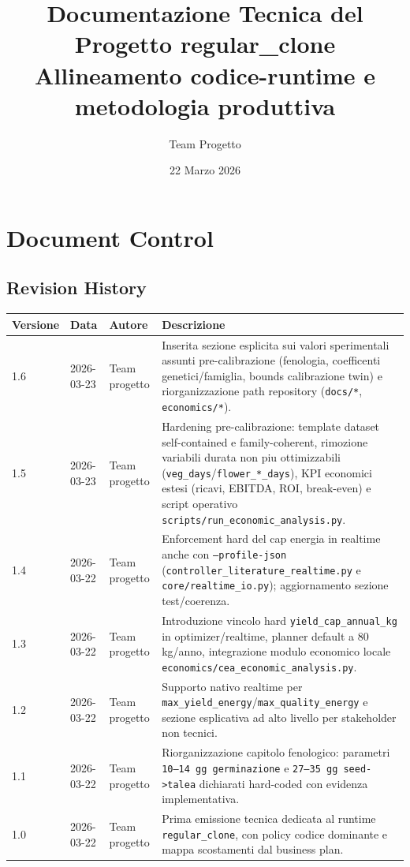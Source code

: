 ﻿\documentclass[11pt,a4paper]{report}
\title{
  \vspace{2cm}
  \textbf{Documentazione Tecnica del Progetto regular\_clone}\\
  \large Allineamento codice-runtime e metodologia produttiva
}
\author{Team Progetto}
\date{22 Marzo 2026}
\begin{document}
\maketitle
\tableofcontents
\newpage

\chapter{Document Control}

\section{Revision History}
\begin{longtable}{@{}p{2.2cm}p{2.2cm}p{3.6cm}p{6.8cm}@{}}
\toprule
Versione & Data & Autore & Descrizione \\ \midrule
1.6 & 2026-03-23 & Team progetto & Inserita sezione esplicita sui valori sperimentali assunti pre-calibrazione (fenologia, coefficenti genetici/famiglia, bounds calibrazione twin) e riorganizzazione path repository (\texttt{docs/*}, \texttt{economics/*}). \\
1.5 & 2026-03-23 & Team progetto & Hardening pre-calibrazione: template dataset self-contained e family-coherent, rimozione variabili durata non piu ottimizzabili (\texttt{veg\_days}/\texttt{flower\_*\_days}), KPI economici estesi (ricavi, EBITDA, ROI, break-even) e script operativo \texttt{scripts/run\_economic\_analysis.py}. \\
1.4 & 2026-03-22 & Team progetto & Enforcement hard del cap energia in realtime anche con \texttt{--profile-json} (\texttt{controller\_literature\_realtime.py} e \texttt{core/realtime\_io.py}); aggiornamento sezione test/coerenza. \\
1.3 & 2026-03-22 & Team progetto & Introduzione vincolo hard \texttt{yield\_cap\_annual\_kg} in optimizer/realtime, planner default a 80 kg/anno, integrazione modulo economico locale \texttt{economics/cea\_economic\_analysis.py}. \\
1.2 & 2026-03-22 & Team progetto & Supporto nativo realtime per \texttt{max\_yield\_energy}/\texttt{max\_quality\_energy} e sezione esplicativa ad alto livello per stakeholder non tecnici. \\
1.1 & 2026-03-22 & Team progetto & Riorganizzazione capitolo fenologico: parametri \texttt{10--14 gg germinazione} e \texttt{27--35 gg seed->talea} dichiarati hard-coded con evidenza implementativa. \\
1.0 & 2026-03-22 & Team progetto & Prima emissione tecnica dedicata al runtime \texttt{regular\_clone}, con policy codice dominante e mappa scostamenti dal business plan. \\
\bottomrule
\end{longtable}
\end{document}
